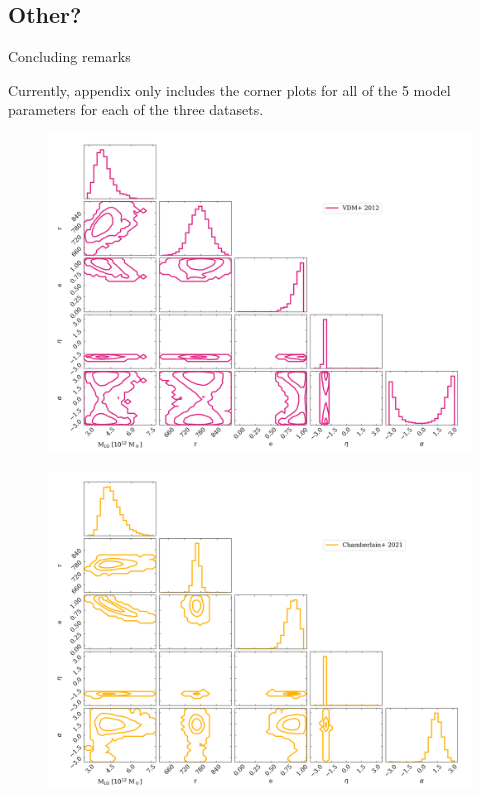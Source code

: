 \documentclass[twocolumn]{aastex631}
\begin{document}
\subsection{Other?}
Concluding remarks

\appendix
Currently, appendix only includes the corner plots for all of the 5 model parameters for each of the three datasets. 
\begin{figure}[htb]
  \centering
  \includegraphics[width=0.8\columnwidth]{analyze-runs-all-vdm2012.png}
  \caption{\label{fig:contour-vdm}
  }
\end{figure}
\begin{figure}[htb]
  \centering
  \includegraphics[width=0.8\columnwidth]{analyze-runs-all-fiducial2021.png}
  \caption{\label{fig:contour-fiducial}
  }
\end{figure}
\end{document}
